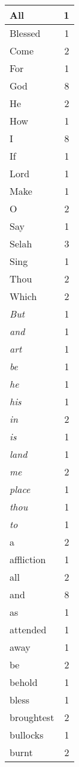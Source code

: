 \begin{center}
\begin{longtable}{l|r}
\hline \hline
\endlastfoot
All & 1 \\ \hline
Blessed & 1 \\ \hline
Come & 2 \\ \hline
For & 1 \\ \hline
God & 8 \\ \hline
He & 2 \\ \hline
How & 1 \\ \hline
I & 8 \\ \hline
If & 1 \\ \hline
Lord & 1 \\ \hline
Make & 1 \\ \hline
O & 2 \\ \hline
Say & 1 \\ \hline
Selah & 3 \\ \hline
Sing & 1 \\ \hline
Thou & 2 \\ \hline
Which & 2 \\ \hline
\emph{But} & 1 \\ \hline
\emph{and} & 1 \\ \hline
\emph{art} & 1 \\ \hline
\emph{be} & 1 \\ \hline
\emph{he} & 1 \\ \hline
\emph{his} & 1 \\ \hline
\emph{in} & 2 \\ \hline
\emph{is} & 1 \\ \hline
\emph{land} & 1 \\ \hline
\emph{me} & 2 \\ \hline
\emph{place} & 1 \\ \hline
\emph{thou} & 1 \\ \hline
\emph{to} & 1 \\ \hline
a & 2 \\ \hline
affliction & 1 \\ \hline
all & 2 \\ \hline
and & 8 \\ \hline
as & 1 \\ \hline
attended & 1 \\ \hline
away & 1 \\ \hline
be & 2 \\ \hline
behold & 1 \\ \hline
bless & 1 \\ \hline
broughtest & 2 \\ \hline
bullocks & 1 \\ \hline
burnt & 2 \\ \hline

\end{longtable}
\end{center}

